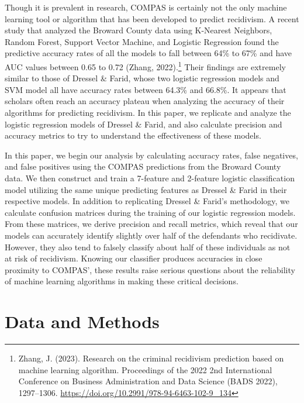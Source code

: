\documentclass[12pt, ]{article}
\begin{document}
Though it is prevalent in research, COMPAS is certainly not the only
machine learning tool or algorithm that has been developed to predict
recidivism. A recent study that analyzed the Broward County data using
K-Nearest Neighbors, Random Forest, Support Vector Machine, and Logistic
Regression found the predictive accuracy rates of all the models to fall
between 64\% to 67\% and have AUC values between 0.65 to 0.72 (Zhang,
2022).\footnote{Zhang, J. (2023). Research on the criminal recidivism
  prediction based on machine learning algorithm. Proceedings of the
  2022 2nd International Conference on Business Administration and Data
  Science (BADS 2022), 1297--1306.
  \url{https://doi.org/10.2991/978-94-6463-102-9_134}} Their findings
are extremely similar to those of Dressel \& Farid, whose two logistic
regression models and SVM model all have accuracy rates between 64.3\%
and 66.8\%. It appears that scholars often reach an accuracy plateau
when analyzing the accuracy of their algorithms for predicting
recidivism. In this paper, we replicate and analyze the logistic
regression models of Dressel \& Farid, and also calculate precision and
accuracy metrics to try to understand the effectiveness of these models.

In this paper, we begin our analysis by calculating accuracy rates,
false negatives, and false positives using the COMPAS predictions from
the Broward County data. We then construct and train a 7-feature and
2-feature logistic classification model utilizing the same unique
predicting features as Dressel \& Farid in their respective models. In
addition to replicating Dressel \& Farid's methodology, we calculate
confusion matrices during the training of our logistic regression
models. From these matrices, we derive precision and recall metrics,
which reveal that our models can accurately identify slightly over half
of the defendants who recidivate. However, they also tend to falsely
classify about half of these individuals as not at risk of recidivism.
Knowing our classifier produces accuracies in close proximity to
COMPAS', these results raise serious questions about the reliability of
machine learning algorithms in making these critical decisions.

\hypertarget{data-and-methods}{%
\section{Data and Methods}\label{data-and-methods}}
\end{document}
